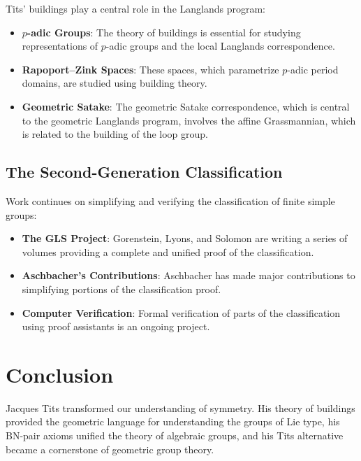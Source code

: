 Tits' buildings play a central role in the Langlands program:

\begin{itemize}
\item \textbf{$p$-adic Groups}: The theory of buildings is essential for studying representations of $p$-adic groups and the local Langlands correspondence.

\item \textbf{Rapoport--Zink Spaces}: These spaces, which parametrize $p$-adic period domains, are studied using building theory.

\item \textbf{Geometric Satake}: The geometric Satake correspondence, which is central to the geometric Langlands program, involves the affine Grassmannian, which is related to the building of the loop group.
\end{itemize}

\subsection{The Second-Generation Classification}

Work continues on simplifying and verifying the classification of finite simple groups:

\begin{itemize}
\item \textbf{The GLS Project}: Gorenstein, Lyons, and Solomon are writing a series of volumes providing a complete and unified proof of the classification.

\item \textbf{Aschbacher's Contributions}: Aschbacher has made major contributions to simplifying portions of the classification proof.

\item \textbf{Computer Verification}: Formal verification of parts of the classification using proof assistants is an ongoing project.
\end{itemize}

\section{Conclusion}

Jacques Tits transformed our understanding of symmetry. His theory of buildings provided the geometric language for understanding the groups of Lie type, his BN-pair axioms unified the theory of algebraic groups, and his Tits alternative became a cornerstone of geometric group theory.


